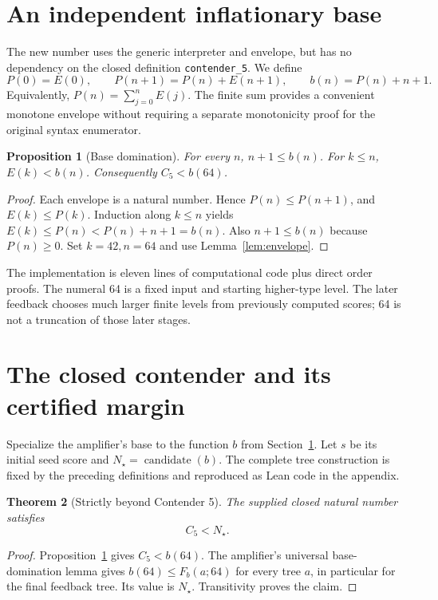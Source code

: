 \documentclass[11pt,letterpaper]{article}
\newtheorem{theorem}{Theorem}[section]
\newtheorem{proposition}[theorem]{Proposition}
\theoremstyle{definition}
\newcommand{\Cfive}{\ensuremath{C_5}}
\newcommand{\Cnew}{\ensuremath{N_\star}}
\newcommand{\code}[1]{\texttt{#1}}
\begin{document}
\section{An independent inflationary base}
\label{sec:base}

The new number uses the generic interpreter and envelope, but has no dependency
on the closed definition \code{contender\_5}. We define
\[
 P(0)=E(0),\qquad P(n+1)=P(n)+E(n+1),\qquad b(n)=P(n)+n+1.
\]
Equivalently, \(P(n)=\sum_{j=0}^{n}E(j)\). The finite sum provides a convenient
monotone envelope without requiring a separate monotonicity proof for the
original syntax enumerator.

\begin{proposition}[Base domination]
\label{prop:base}
For every \(n\), \(n+1\le b(n)\). For \(k\le n\),
\(E(k)<b(n)\). Consequently \(\Cfive<b(64)\).
\end{proposition}
\begin{proof}
Each envelope is a natural number. Hence \(P(n)\le P(n+1)\), and
\(E(k)\le P(k)\). Induction along \(k\le n\) yields
\(E(k)\le P(n)<P(n)+n+1=b(n)\). Also \(n+1\le b(n)\)
because \(P(n)\ge0\). Set \(k=42,n=64\) and use
Lemma~\ref{lem:envelope}.
\end{proof}

The implementation is eleven lines of computational code plus direct order
proofs. The numeral 64 is a fixed input and starting higher-type level. The
later feedback chooses much larger finite levels from previously computed
scores; 64 is not a truncation of those later stages.



\section{The closed contender and its certified margin}
\label{sec:final}

Specialize the amplifier's base to the function \(b\) from
Section~\ref{sec:base}. Let \(s\) be its initial seed score and
\(\Cnew=\operatorname{candidate}(b)\). The complete tree construction is
fixed by the preceding definitions and reproduced as Lean code in the
appendix.

\begin{theorem}[Strictly beyond Contender 5]
\label{thm:main}
The supplied closed natural number satisfies
\[
 \Cfive<\Cnew.
\]
\end{theorem}
\begin{proof}
Proposition~\ref{prop:base} gives \(\Cfive<b(64)\). The amplifier's
universal base-domination lemma gives
\(b(64)\le F_b(a;64)\) for every tree \(a\), in particular for the final
feedback tree. Its value is \Cnew. Transitivity proves the claim.
\end{proof}
\end{document}
